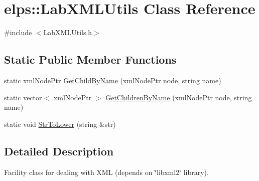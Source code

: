 \hypertarget{classelps_1_1_lab_x_m_l_utils}{\section{elps\+:\+:Lab\+X\+M\+L\+Utils Class Reference}
\label{classelps_1_1_lab_x_m_l_utils}
}


{\ttfamily \#include $<$Lab\+X\+M\+L\+Utils.\+h$>$}

\subsection*{Static Public Member Functions}
\begin{DoxyCompactItemize}
\item 
static xml\+Node\+Ptr \hyperlink{classelps_1_1_lab_x_m_l_utils_a4cd0f2dcacb57b50384c592c55dccc63}{Get\+Child\+By\+Name} (xml\+Node\+Ptr node, string name)
\item 
static vector$<$ xml\+Node\+Ptr $>$ \hyperlink{classelps_1_1_lab_x_m_l_utils_a7535c2a5de5aa80a4d2a84a90090d149}{Get\+Children\+By\+Name} (xml\+Node\+Ptr node, string name)
\item 
static void \hyperlink{classelps_1_1_lab_x_m_l_utils_aa027d214be66953afcba86e5384dcf70}{Str\+To\+Lower} (string \&str)
\end{DoxyCompactItemize}


\subsection{Detailed Description}
Facility class for dealing with X\+M\+L (depends on \char`\"{}libxml2\char`\"{} library). 

